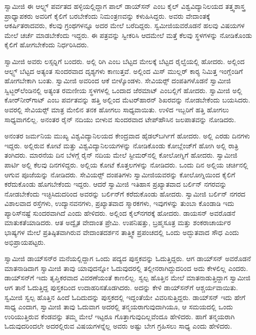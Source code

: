  ಸ್ವಾಮೀಜಿ ಈ ಆಲ್ಫ್ಸ್ ಪರ್ವತದ ಹಳ್ಳಿಯಲ್ಲಿದ್ದಾಗ ಪಾಲ್ ಡಾಯ್‍ಸನ್ ಎಂಬ ಕೈಲ್ ವಿಶ್ವವಿದ್ಯಾನಿಲಯದ ತತ್ತ್ವಶಾಸ್ತ್ರ ಪ್ರಾಧ್ಯಾಪಕರು ಅವರಿಗೆ ಕೈಲಿಗೆ ಬರಬೇಕೆಂದು ನಿಮಂತ್ರಣವನ್ನು ಕಳುಹಿಸಿದ್ದರು. ಅವರು ವೇದಾಂತಕ್ಕೆ ಆಕರ್ಷಿತರಾದವರು, ಕೆಲವು ಗ್ರಂಥಗಳನ್ನೂ ಅದರ ಮೇಲೆ ಬರೆದಿದ್ದರು. ಸ್ವಮೀಜಿಯವರೊಡನೆ ಹಲವು ವಿಷಯಗಳ ಮೇಲೆ ಚರ್ಚೆ ಮಾಡಬೇಕೆಂದು ಇದ್ದರು. ಈ ಪತ್ರವನ್ನು ಸ್ವೀಕರಿಸಿ ಆದಮೇಲೆ ಮತ್ತೆ ಕೆಲವು ಸ್ಥಳಗಳನ್ನು ನೋಡಿಕೊಂಡು ಕೈಲಿಗೆ ಹೋಗಬೇಕೆಂದು ನಿರ್ಧರಿಸಿದರು. 

 ಸ್ವಾಮೀಜಿ ಅವರು ಲಸ್ಸರ‍್ನಿಗೆ ಬಂದರು. ಅಲ್ಲಿ ರಿಗಿ ಎಂಬ ಬೆಟ್ಟದ ಮೇಲಕ್ಕೆ ಬೆಟ್ಟದ ರೈಲ್ವೆಯಲ್ಲಿ ಹೋದರು. ಅಲ್ಲಿಂದ ಆಲ್ಫ್ಸ್ ಬೆಟ್ಟದ ಅತ್ಯಂತ ಸುಂದರವಾದ ದೃಶ್ಯಗಳು ಕಾಣುತ್ತವೆ. ಅಲ್ಲಿಂದ ಮಿಸ್ ಮುಲ್ಲರ್ ಕಾರ‍್ಯ ನಿಮಿತ್ತ ಇಂಗ್ಲೆಂಡಿಗೆ ಹೋಗಬೇಕಾಗಿ ಬಂತು. ಸ್ವಾಮೀಜಿ ಅವರಿಂದ ಆಕೆ ಬೀಳ್ಕೊಂಡಳು. ಸೇವಿಯರ್ಸ್‍‍ ದಂಪತಿಗಳೊಡನೆ ಸ್ವಾಮೀಜಿ ಸ್ವಿಟ್ಜರ್‌ಲೆಂಡಿನಲ್ಲಿ ಅತ್ಯಂತ ರಮಣೀಯ ಸ್ಥಳಗಳಲ್ಲಿ ಒಂದಾದ ಜೆರಮಾಟ್ ಎಂಬಲ್ಲಿಗೆ ಹೋದರು. ಸ್ವಾಮೀಜಿ ಅಲ್ಲಿ ಕೋರ್‌ನೀರ್‌ಗಾಟ್ ಎಂಬ ಪರ್ವತವನ್ನು ಹತ್ತಿ ಅಲ್ಲಿಂದ ಮೆಟರ್‌ಹಾರನ್ ಶಿಖರವನ್ನು ನೋಡಬೇಕೆಂದು ಬಯಸಿದರು. ಅವರಲ್ಲಿ ಸೇವಿಯರ್ಸ್‍‍ ಮಾತ್ರ ಮೇಲಿನ ತನಕ ಹೋಗಲು ಸಾಧ್ಯವಾಯಿತು. ಉಳಿದ ಇಬ್ಬರಿಗೆ ಹತ್ತಿ ಹೋಗಲು ಸಾಧ್ಯವಾಗಲಿಲ್ಲ. ಅನಂತರ ರೈನ್ ನದಿಯು ಬೀಳುವ ಸುಂದರವಾದ ಟೇಪ್‍ಹೌಸಿನ ಜಲಪಾತವನ್ನು ನೋಡಿದರು. 

 ಅನಂತರ ಜರ್ಮನಿಯ ಮುಖ್ಯ ವಿಶ್ವವಿದ್ಯಾನಿಲಯದ ಕೇಂದ್ರವಾದ ಹೈಡಲ್‍ಬರ್ಗಿಗೆ ಹೋದರು. ಅಲ್ಲಿ ಎರಡು ದಿನಗಳು ಇದ್ದರು. ಅಲ್ಲಿರುವ ಕೋಟೆ ಮತ್ತು ವಿಶ್ವವಿದ್ಯಾನಿಲಯಗಳನ್ನು ನೋಡಿಕೊಂಡು ಕೋಬ್ಲೆಂಜ್‍ಗೆ ಹೋಗಿ ಅಲ್ಲಿ ರಾತ್ರಿ ತಂಗಿದರು. ಮಾರನೆಯ ದಿನ ಬೆಳಗ್ಗೆ ರೈನ್ ನದಿಯ ಮೇಲೆ ಸ್ಟೀಮರ್‌ನಲ್ಲಿ ಕೋಲೋಗ್ನಿಗೆ ಹೋದರು. ಸ್ವಾಮೀಜಿ ಪಾರ್ಟಿ ಅಲ್ಲಿ ಕೆಲವು ದಿನಗಳಿದ್ದರು. ಅಲ್ಲಿಯ ಕೋಟೆ ಕೊತ್ತಲಗಳನ್ನು ನೋಡಿದರು. ಒಂದು ದಿನ ಅಲ್ಲಿಯ ಚರ್ಚಿನಲ್ಲಿ ಆಗುವ ಪೂಜೆಯನ್ನು ನೋಡಿದರು. ಸೇವಿಯರ್ಸ್‍‍ ದಂಪತಿಗಳು ಸ್ವಾಮೀಜಿಯವರನ್ನು ಕೋಲೋಗ್ನಿಯಿಂದ ಕೈಲಿಗೆ ಕರೆದುಕೊಂಡು ಹೊಗಬೇಕೆಂದು ಇದ್ದರು. ಆದರೆ ಸ್ವಾಮೀಜಿ ಇತಿಹಾಸ ಪ್ರಖ್ಯಾತವಾದ ಬರ್ಲಿನ್ ನಗರವನ್ನು ನೋಡಬೇಕೆಂದು ಇಚ್ಛಿಸಿದುದರಿಂದ ಅವರನ್ನು ಬರ್ಲಿನ್‍ಗೆ ಕರೆದುಕೊಂಡು ಹೋದರು. ಸ್ವಾಮೀಜಿ ಬರ್ಲಿನ್ ನಗರದ ವಿಶಾಲವಾದ ರಸ್ತೆಗಳು, ಉದ್ಯಾನವನಗಳು, ಪ್ರಖ್ಯಾತವಾದ ಸ್ಮಾರಕಗಳು, ಇವುಗಳನ್ನು ತುಂಬಾ ಕೊಂಡಾಡಿ ಇದು ಪ್ಯಾರಿಸ್‍ನಷ್ಟೆ ಸುಂದರವಾಗಿದೆ ಎಂದು ಹೇಳಿದರು. ಅಲ್ಲಿಂದ ಕೈಲ್‍ನಗರಕ್ಕೆ ಹೋದರು. ಡಾಯಸನ್ ಅವರೊಡನೆ ಮಾತುಕತೆಯಾಡಿದರು. ಆತ ಅದ್ವೈತ ವೇದಾಂತ ಪ್ರೇಮಿ. ಉಪನಿಷತ್ತು, ಬ್ರಹ್ಮಸೂತ್ರ ಮತ್ತು ಶಂಕರಾಚಾರ್ಯರ ಭಾಷ್ಯಗಳ ಮೇಲೆ ಪ್ರತಿಷ್ಠಿತವಾಗಿರುವ ವೇದಾಂತದರ್ಶನ ತಾತ್ತ್ವಿಕ ಪ್ರಪಂಚದಲ್ಲಿ ಒಂದು ಅದ್ಭುತವಾದ ಸೌಧ ಎಂದು ಅಭಿಪ್ರಾಯಪಟ್ಟರು. 

 ಸ್ವಾಮೀಜಿ ಡಾಯ್‍ಸನ್‍ರ ಮನೆಯಲ್ಲಿದ್ದಾಗ ಒಂದು ಪದ್ಯದ ಪುಸ್ತಕವನ್ನು ಓದುತ್ತಿದ್ದರು. ಆಗ ಡಾಯ್‍ಸನ್‍ ಅವರೊಡನೆ ಮಾತನಾಡಿದಾಗ ಸ್ವಾಮೀಜಿ ತಾವು ಯಾವುದನ್ನೋ ಓದುವುದರಲ್ಲಿ ತಲ್ಲೀನರಾಗಿದ್ದುದರಿಂದ ಅದು ಕೇಳಲಿಲ್ಲ ಎಂದರು. ಡಾಯ್‍ಸನ್‍ಗೆ ಇದು ತೃಪ್ತಿಕರವಾದ ವಿವರಣೆಯಂತೆ ಕಾಣಲಿಲ್ಲ. ಸ್ವಲ್ಪ ಹೊತ್ತಿನ ಮೇಲೆ ಮಾತನಾಡುತ್ತಿದ್ದಾಗ ಸ್ವಾಮೀಜಿ ಆಗ ತಾನೆ ಓದುತ್ತಿದ್ದ ಪುಸ್ತಕದಿಂದ ಉದಾಹರಿಸತೊಡಗಿದರು. ಅದನ್ನು ಕೇಳಿ ಡಾಯ್‍ಸನ್‍ಗೆ ಆಶ್ಚರ್ಯವಾಯಿತು. ಸ್ವಮೀಜಿ ಸ್ವಲ್ಪ ಹೊತ್ತಿನ ಹಿಂದೆ ಓದಿದುದನ್ನು ಪುಸ್ತಕದಲ್ಲಿ ಇದ್ದಂತೆಯೇ ವಿವರಿಸುತ್ತಿದ್ದರು. ಡಾಯ್‍ಸನ್‍ ಇದು ಹೇಗೆ ಸಾಧ್ಯ ಎಂದಾಗ, ಸ್ವಾಮೀಜಿ ತಾವು ಓದುವಾಗ ಅದರಲ್ಲಿ ತನ್ಮಯರಾಗುವುದಾಗಿಯೂ, ಆ ಸಮಯದಲ್ಲಿ ಒಂದು ಉರಿಯುತ್ತಿರುವ ಕೆಂಡವನ್ನು ತಮ್ಮ ಮೇಲೆ ಇಟ್ಟರೂ ಗೊತ್ತಾಗುವುದಿಲ್ಲವೆಂದೂ ಹೇಳಿದರು. ಹಾಗೆ ತನ್ಮಯರಾಗಿ ಓದುವುದರಿಂದಲೇ ಅದರಲ್ಲಿರುವ ವಿಷಯಗಳನ್ನೆಲ್ಲ ಅವರು ಅಷ್ಟು ಬೇಗ ಗ್ರಹಿಸಲು ಸಾಧ್ಯ ಎಂದು ಹೇಳಿದರು. 

